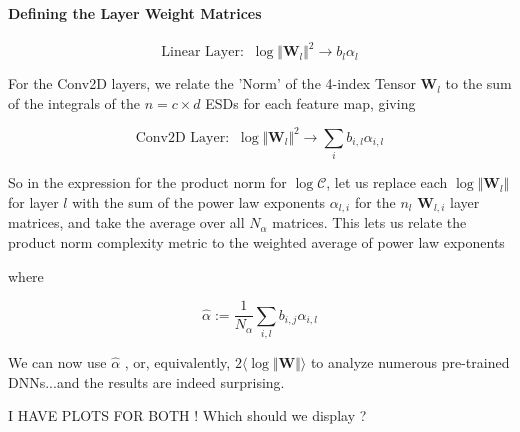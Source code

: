 \paragraph{Defining the Layer Weight Matrices}

$$\text{Linear Layer:}\;\;\log\Vert\mathbf{W}_{l}\Vert^{2}\rightarrow b_{l}\alpha_{l}$$

For the Conv2D layers, we relate the 'Norm' of the 4-index Tensor $\mathbf{W}_{l}$ to the sum of the integrals of the $n=c\times d$ ESDs for each feature map, giving 

$$\text{Conv2D Layer:}\;\;\log\Vert\mathbf{W}_{l}\Vert^{2}\rightarrow \sum_{i}b_{i,l}\alpha_{i,l}$$

So in the expression for the product norm for $\log\mathcal{C}$, let us replace each $\log\Vert\mathbf{W}_{l}\Vert$ for layer $l$ with the sum of the power law exponents $\alpha_{l,i}$ for the $n{_l}$ $\mathbf{W}_{l,i}$ layer matrices, and take the average over all $N_{\alpha}$  matrices.  This lets us relate the product norm complexity metric to the weighted average of power law exponents

where

$$\hat{\alpha}:=\dfrac{1}{N_{\alpha}}\sum_{i,l}b_{i,j}\alpha_{i,l}$$


We can now use $\hat{\alpha}$ ,  or, equivalently, $2\langle\log\Vert\mathbf{W}\Vert\rangle$ to analyze numerous pre-trained DNNs...and the results are indeed surprising.

I HAVE PLOTS FOR BOTH !
Which should we display ?  


